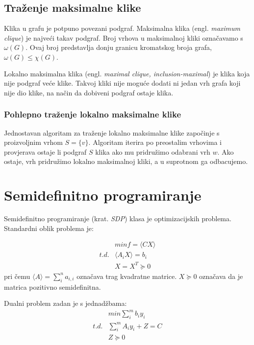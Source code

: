 \documentclass[diplomskirad]{fer}
\begin{document}
\section{Traženje maksimalne klike}
Klika u grafu je potpuno povezani podgraf. Maksimalna klika (engl. \textit{maximum clique}) je najveći takav podgraf. Broj vrhova u maksimalnoj kliki označavamo s $\omega(G)$.
Ovaj broj predstavlja donju granicu kromatskog broja grafa, $\omega(G) \leq \chi(G)$.

Lokalno maksimalna klika (engl. \textit{maximal clique, inclusion-maximal}) je klika koja nije podgraf veće klike. Takvoj kliki nije moguće dodati ni jedan
vrh grafa koji nije dio klike, na način da dobiveni podgraf ostaje klika.

\subsection{Pohlepno traženje lokalno maksimalne klike}
\label{pog:greedy_clique}
Jednostavan algoritam za traženje lokalno maksimalne klike započinje s proizvoljnim vrhom $S = \{v\}$. Algoritam iterira po preostalim vrhovima i provjerava ostaje li
podgraf $S$ klika ako mu pridružimo odabrani vrh $w$. Ako ostaje, vrh pridružimo lokalno maksimalnoj kliki, a u suprotnom ga odbacujemo.

\chapter{Semidefinitno programiranje}
\label{pog:semidefinitno_programiranje}
Semidefinitno programiranje (krat. \textit{SDP}) klasa je optimizacijskih problema.
Standardni oblik problema je:

\begin{equation}
\begin{split}
  & min f = \langle CX \rangle \\
  t. d. & \langle A_iX \rangle = b_i \\
        & X = X^T \succeq 0
\end{split}
\end{equation}
pri čemu $ \langle A \rangle = \sum_{i}^{n} a_{i,i} $
označava trag kvadratne matrice. $X \succeq 0$ označava da je matrica pozitivno semidefinitna.

Dualni problem zadan je s jednadžbama: 
\begin{equation}
\begin{split}
  & min \sum_{i}^{m} b_iy_i \\
  t.d. & \sum_{i}^{m} A_iy_i + Z = C \\
      & Z \succeq 0 \\
\end{split}
\end{equation}
\end{document}

